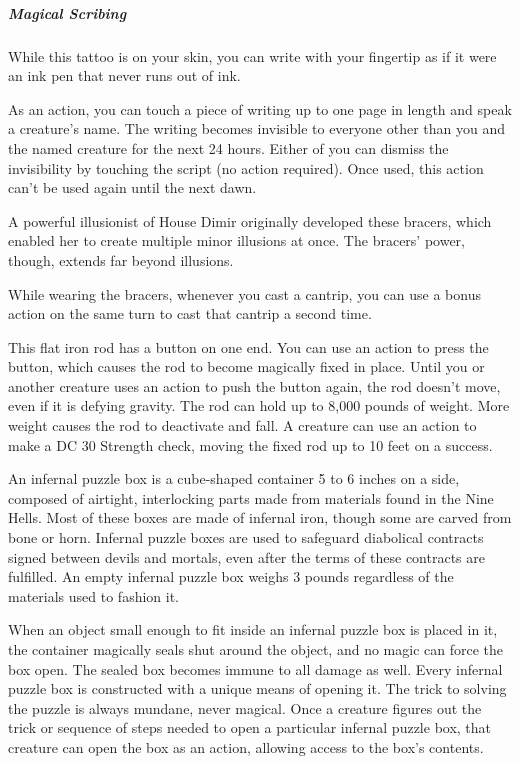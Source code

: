 \documentclass[10pt,a4paper,twoside,bg=print,twocolumn,openany,nodeprecatedcode]{dndbook}
\begin{document}
\subparagraph{Magical Scribing}
While this tattoo is on your skin, you can write with your fingertip as if it were an ink pen that never runs out of ink.

As an action, you can touch a piece of writing up to one page in length and speak a creature's name. The writing becomes invisible to everyone other than you and the named creature for the next 24 hours. Either of you can dismiss the invisibility by touching the script (no action required). Once used, this action can't be used again until the next dawn.

A powerful illusionist of House Dimir originally developed these bracers, which enabled her to create multiple minor illusions at once. The bracers' power, though, extends far beyond illusions.

While wearing the bracers, whenever you cast a cantrip, you can use a bonus action on the same turn to cast that cantrip a second time.

This flat iron rod has a button on one end. You can use an action to press the button, which causes the rod to become magically fixed in place. Until you or another creature uses an action to push the button again, the rod doesn't move, even if it is defying gravity. The rod can hold up to 8,000 pounds of weight. More weight causes the rod to deactivate and fall. A creature can use an action to make a DC 30 Strength check, moving the fixed rod up to 10 feet on a success.

An infernal puzzle box is a cube-shaped container 5 to 6 inches on a side, composed of airtight, interlocking parts made from materials found in the Nine Hells. Most of these boxes are made of infernal iron, though some are carved from bone or horn. Infernal puzzle boxes are used to safeguard diabolical contracts signed between devils and mortals, even after the terms of these contracts are fulfilled. An empty infernal puzzle box weighs 3 pounds regardless of the materials used to fashion it.

When an object small enough to fit inside an infernal puzzle box is placed in it, the container magically seals shut around the object, and no magic can force the box open. The sealed box becomes immune to all damage as well. Every infernal puzzle box is constructed with a unique means of opening it. The trick to solving the puzzle is always mundane, never magical. Once a creature figures out the trick or sequence of steps needed to open a particular infernal puzzle box, that creature can open the box as an action, allowing access to the box's contents.
\end{document}
